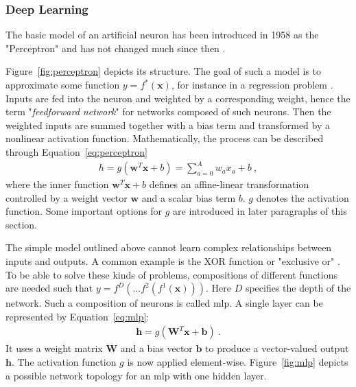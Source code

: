 \subsubsection{Deep Learning}\label{sssec:deep_learning}
The basic model of an artificial neuron has been introduced in 1958 as the "Perceptron" and has not changed much since then \cite{rosenblattPerceptronProbabilisticModel1958}. 

Figure~\ref{fig:perceptron} depicts its structure. The goal of such a model is to approximate some function $y = f^*(\mathbf x)$, for instance in a regression problem \cite{goodfellowDeepLearning2016}. Inputs are fed into the neuron and weighted by a corresponding weight, hence the term "\emph{feedforward network}" for networks composed of such neurons. Then the weighted inputs are summed together with a bias term and transformed by a nonlinear activation function. Mathematically, the process can be described through Equation~\ref{eq:perceptron} \cite{goodfellowDeepLearning2016}
\begin{gather}\label{eq:perceptron}
    h = g (\mathbf w^T \mathbf x + b) = \sum_{a=0}^A w_a x_a + b~,
\end{gather}
where the inner function $\mathbf w^T \mathbf x + b$ defines an affine-linear transformation controlled by a weight vector $\mathbf w$ and a scalar bias term $b$. $g$ denotes the activation function. Some important options for $g$ are introduced in later paragraphs of this section.

The simple model outlined above cannot learn complex relationships between inputs and outputs. A common example is the XOR function or "exclusive or" \cite{goodfellowDeepLearning2016}. To be able to solve these kinds of problems, compositions of different functions are needed such that $y = f^D ( \ldots f^2 ( f^1(\mathbf x) ) )$. Here $D$ specifies the depth of the network. Such a composition of neurons is called \gls{mlp}. A single layer can be represented by Equation~\ref{eq:mlp}:
\begin{gather}\label{eq:mlp}
    \mathbf h = g  (\mathbf W^T \mathbf x + \mathbf b)~.
\end{gather}
It uses a weight matrix $\mathbf W$ and a bias vector $\mathbf b$ to produce a vector-valued output $\mathbf h$. The activation function $g$ is now applied element-wise. Figure~\ref{fig:mlp} depicts a possible network topology for an \gls{mlp} with one hidden layer.


